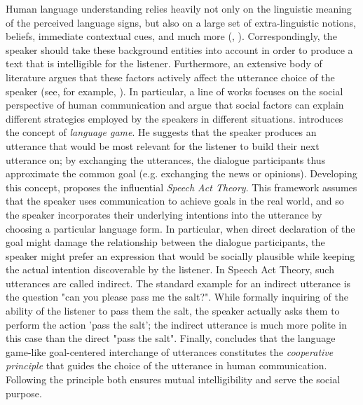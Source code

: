 \documentclass[11pt]{article}
\begin{document}
Human language understanding relies heavily not only on the linguistic meaning of the perceived language signs, but also on a large set of extra-linguistic notions, beliefs, immediate contextual cues, and much more (\citealt{schubert-1986}, \citealt{wittgenstein-1953}). Correspondingly, the speaker should take these background entities into account in order to produce a text that is intelligible for the listener. Furthermore, an extensive body of literature argues that these factors actively affect the utterance choice of the speaker (see, for example, \citealt{van-dijk-1990}). In particular, a line of works focuses on the social perspective of human communication and argue that social factors can explain different strategies employed by the speakers in different situations. \citet{wittgenstein-1953} introduces the concept of \textit{language game}. He suggests that the speaker produces an utterance that would be most relevant for the listener to build their next utterance on; by exchanging the utterances, the dialogue participants thus approximate the common goal (e.g. exchanging the news or opinions). Developing this concept, \citet{austin-1962} proposes the influential \textit{Speech Act Theory}. This framework assumes that the speaker uses communication to achieve goals in the real world, and so the speaker incorporates their underlying intentions into the utterance by choosing a particular language form. In particular, when direct declaration of the goal might damage the relationship between the dialogue participants, the speaker might prefer an expression that would be socially plausible while keeping the actual intention discoverable by the listener. In Speech Act Theory, such utterances are called indirect. The standard example for an indirect utterance is the question "can you please pass me the salt?". While formally inquiring of the ability of the listener to pass them the salt, the speaker actually asks them to perform the action 'pass the salt'; the indirect utterance is much more polite in this case than the direct "pass the salt". Finally, \citet{grice-1975} concludes that the language game-like goal-centered interchange of utterances constitutes the \textit{cooperative principle} that guides the choice of the utterance in human communication. Following the principle both ensures mutual intelligibility and serve the social purpose.
\end{document}
